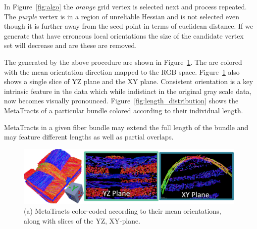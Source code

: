 In Figure~\ref{fig:algo} the \textit{orange} grid vertex is selected next and process repeated. The \textit{purple} vertex is in a region of unreliable Hessian and is not selected even though it is further away from the seed point in terms of euclidean distance. If we generate \mt that have erroneous local orientations the size of the candidate vertex set will decrease and are these are removed.

The \mt generated by the above procedure are shown in Figure~\ref{fig:metaTracts}. The \mt are colored with the mean orientation direction mapped to the RGB space. Figure~\ref{fig:metaTracts} also shows a single slice of YZ plane and the XY plane. Consistent orientation is a key intrinsic feature in the data which while indistinct in the original gray scale data, now becomes visually pronounced.
Figure~\ref{fig:length_distribution} shows the MetaTracts of a particular bundle colored according to their individual length.

MetaTracts in a given fiber bundle may extend the full length of the bundle and may feature different lengths as well as partial overlaps.

\begin{figure}[htb]
\centering
	\includegraphics[width=\linewidth]{images/metaTracts.eps}
	\caption{(a) MetaTracts color-coded according to their mean orientations, along with slices of the YZ, XY-plane.}
	\label{fig:metaTracts}
\end{figure}


